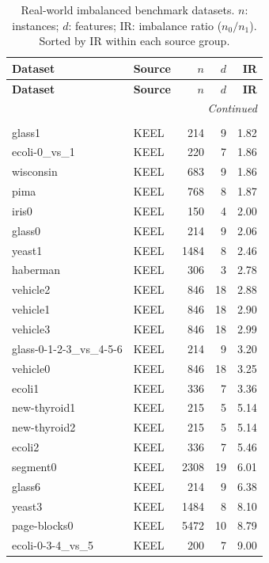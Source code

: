 \begin{longtable}{llrrr}
\caption{Real-world imbalanced benchmark datasets. $n$: instances; $d$: features; IR: imbalance ratio ($n_0/n_1$). Sorted by IR within each source group.}
\label{tab:datasets_summary} \\
\toprule
\textbf{Dataset} & \textbf{Source} & \textbf{$n$} & \textbf{$d$} & \textbf{IR} \\
\midrule
\endfirsthead
\toprule
\textbf{Dataset} & \textbf{Source} & \textbf{$n$} & \textbf{$d$} & \textbf{IR} \\
\midrule
\endhead
\midrule \multicolumn{5}{r}{\textit{Continued}} \\
\endfoot
\bottomrule
\endlastfoot
\multicolumn{5}{l}{\textit{KEEL Imbalanced Repository}} \\
\midrule
    glass1 & KEEL & 214 & 9 & 1.82 \\
    ecoli-0\_vs\_1 & KEEL & 220 & 7 & 1.86 \\
    wisconsin & KEEL & 683 & 9 & 1.86 \\
    pima & KEEL & 768 & 8 & 1.87 \\
    iris0 & KEEL & 150 & 4 & 2.00 \\
    glass0 & KEEL & 214 & 9 & 2.06 \\
    yeast1 & KEEL & 1484 & 8 & 2.46 \\
    haberman & KEEL & 306 & 3 & 2.78 \\
    vehicle2 & KEEL & 846 & 18 & 2.88 \\
    vehicle1 & KEEL & 846 & 18 & 2.90 \\
    vehicle3 & KEEL & 846 & 18 & 2.99 \\
    glass-0-1-2-3\_vs\_4-5-6 & KEEL & 214 & 9 & 3.20 \\
    vehicle0 & KEEL & 846 & 18 & 3.25 \\
    ecoli1 & KEEL & 336 & 7 & 3.36 \\
    new-thyroid1 & KEEL & 215 & 5 & 5.14 \\
    new-thyroid2 & KEEL & 215 & 5 & 5.14 \\
    ecoli2 & KEEL & 336 & 7 & 5.46 \\
    segment0 & KEEL & 2308 & 19 & 6.01 \\
    glass6 & KEEL & 214 & 9 & 6.38 \\
    yeast3 & KEEL & 1484 & 8 & 8.10 \\
    page-blocks0 & KEEL & 5472 & 10 & 8.79 \\
    ecoli-0-3-4\_vs\_5 & KEEL & 200 & 7 & 9.00 \\

\end{longtable}
